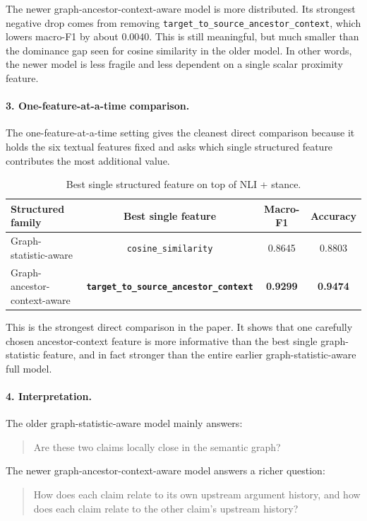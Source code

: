 \documentclass[11pt,a4paper]{article}
\begin{document}
The newer graph-ancestor-context-aware model is more distributed. Its strongest negative drop comes from removing \texttt{target\_to\_source\_ancestor\_context}, which lowers macro-F1 by about \(0.0040\). This is still meaningful, but much smaller than the dominance gap seen for cosine similarity in the older model. In other words, the newer model is less fragile and less dependent on a single scalar proximity feature.

\paragraph{3. One-feature-at-a-time comparison.}
The one-feature-at-a-time setting gives the cleanest direct comparison because it holds the six textual features fixed and asks which single structured feature contributes the most additional value.

\begin{table}[H]
\centering
\caption{Best single structured feature on top of NLI + stance.}
\label{tab:structured_ablation_single_compare}
\begin{tabular}{lccc}
\toprule
Structured family & Best single feature & Macro-F1 & Accuracy \\
\midrule
Graph-statistic-aware & \texttt{cosine\_similarity} & 0.8645 & 0.8803 \\
Graph-ancestor-context-aware & \textbf{\texttt{target\_to\_source\_ancestor\_context}} & \textbf{0.9299} & \textbf{0.9474} \\
\bottomrule
\end{tabular}
\end{table}

This is the strongest direct comparison in the paper. It shows that one carefully chosen ancestor-context feature is more informative than the best single graph-statistic feature, and in fact stronger than the entire earlier graph-statistic-aware full model.

\paragraph{4. Interpretation.}
The older graph-statistic-aware model mainly answers:
\begin{quote}
Are these two claims locally close in the semantic graph?
\end{quote}

The newer graph-ancestor-context-aware model answers a richer question:
\begin{quote}
How does each claim relate to its own upstream argument history, and how does each claim relate to the other claim's upstream history?
\end{quote}
\end{document}
